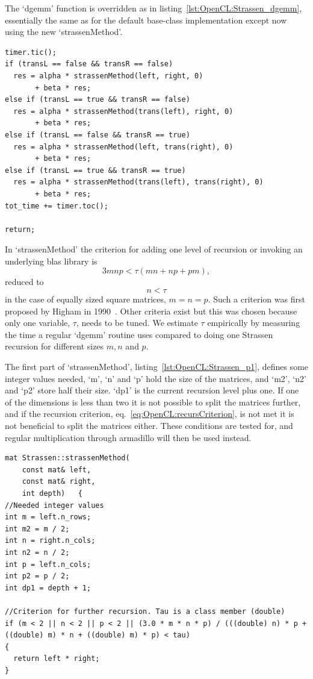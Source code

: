 The `dgemm' function is overridden as in listing~\ref{lst:OpenCL:Strassen_dgemm}, essentially the same as for the default base-class implementation except now using the new \mbox{`strassenMethod'}.
\begin{lstlisting}[float,label={lst:OpenCL:Strassen_dgemm},caption={Strassen overrides the `dgemm' method.}]
timer.tic();
if (transL == false && transR == false)
  res = alpha * strassenMethod(left, right, 0) 
       + beta * res;
else if (transL == true && transR == false)
  res = alpha * strassenMethod(trans(left), right, 0) 
       + beta * res;
else if (transL == false && transR == true)
  res = alpha * strassenMethod(left, trans(right), 0) 
       + beta * res;
else if (transL == true && transR == true)
  res = alpha * strassenMethod(trans(left), trans(right), 0) 
  	   + beta * res;
tot_time += timer.toc();

return;
\end{lstlisting}
In \mbox{`strassenMethod'} the criterion for adding one level of recursion or invoking an underlying blas library is 
\begin{equation}
\label{eq:OpenCL:recursCriterion}
3 m n p < \tau \left( mn + np + pm \right),
\end{equation}
reduced to 
\begin{equation}
n < \tau
\end{equation}
in the case of equally sized square matrices, $m=n=p$.
Such a criterion was first proposed by Higham in 1990~\cite{Higham:1990:EFM:98267.98290}.
Other criteria exist but this was chosen because only one variable, $\tau$, needs to be tuned.
We estimate $\tau$ empirically by measuring the time a regular `dgemm' routine uses compared to doing one Strassen recursion for different sizes $m, n$ and $p$.


The first part of `strassenMethod', listing~\ref{lst:OpenCL:Strassen_p1}, defines some integer values needed, `m', `n' and `p' hold the size of the matrices, and `m2', `n2' and `p2' store half their size.
`dp1' is the current recursion level plus one.
If one of the dimensions is less than two it is not possible to split the matrices further, and if the recursion criterion, eq.~\eqref{eq:OpenCL:recursCriterion}, is not met it is not beneficial to split the matrices either.
These conditions are tested for, and regular multiplication through armadillo will then be used instead.
\begin{lstlisting}[float,label={lst:OpenCL:Strassen_p1},caption={Implementation of Strassen's method. Continued in listing~\ref{lst:OpenCL:Strassen_p2}.},name={strassen_complete}]
mat Strassen::strassenMethod(
	const mat& left, 
	const mat& right, 
	int depth)	 {
//Needed integer values
int m = left.n_rows;
int m2 = m / 2;
int n = right.n_cols;
int n2 = n / 2;
int p = left.n_cols;
int p2 = p / 2;
int dp1 = depth + 1;

//Criterion for further recursion. Tau is a class member (double)
if (m < 2 || n < 2 || p < 2 || (3.0 * m * n * p) / (((double) n) * p + ((double) m) * n + ((double) m) * p) < tau)
{
  return left * right;
}
\end{lstlisting}


